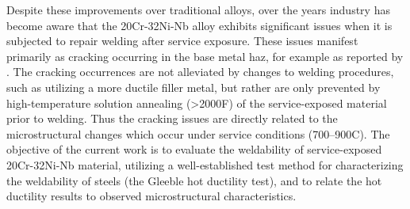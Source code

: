 Despite these improvements over traditional alloys, over the years industry has become aware \cite{api_942_2014} that the 20Cr-32Ni-Nb alloy exhibits significant issues when it is subjected to repair welding after service exposure. These issues manifest primarily as cracking occurring in the base metal \gls{haz}, for example as reported by \citet{hoffman_weld_1998}. The cracking occurrences are not alleviated by changes to welding procedures, such as utilizing a more ductile filler metal, but rather are only prevented by high-temperature solution annealing (>2000\textdegree{}F) of the service-exposed material prior to welding. Thus the cracking issues are directly related to the microstructural changes which occur under service conditions (700--900C). The objective of the current work is to evaluate the weldability of service-exposed 20Cr-32Ni-Nb material, utilizing a well-established test method for characterizing the weldability of steels (the Gleeble hot ductility test), and to relate the hot ductility results to observed microstructural characteristics.












